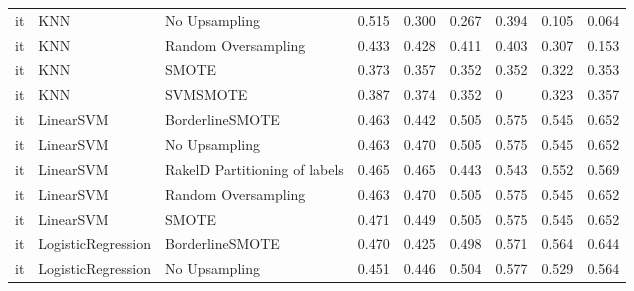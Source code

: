 \begin{tabular}{lllllllll}
      it &                             KNN &                 No Upsampling & 0.515 &                     0.300 &                 0.267 &                  0.394 &                                   0.105 &     0.064 \\
      it &                             KNN &           Random Oversampling & 0.433 &                     0.428 &                 0.411 &                  0.403 &                                   0.307 &     0.153 \\
      it &                             KNN &                         SMOTE & 0.373 &                     0.357 &                 0.352 &                  0.352 &                                   0.322 &     0.353 \\
      it &                             KNN &                      SVMSMOTE & 0.387 &                     0.374 &                 0.352 &                      0 &                                   0.323 &     0.357 \\
      it &                       LinearSVM &               BorderlineSMOTE & 0.463 &                     0.442 &                 0.505 &                  0.575 &                                   0.545 &     0.652 \\
      it &                       LinearSVM &                 No Upsampling & 0.463 &                     0.470 &                 0.505 &                  0.575 &                                   0.545 &     0.652 \\
      it &                       LinearSVM & RakelD Partitioning of labels & 0.465 &                     0.465 &                 0.443 &                  0.543 &                                   0.552 &     0.569 \\
      it &                       LinearSVM &           Random Oversampling & 0.463 &                     0.470 &                 0.505 &                  0.575 &                                   0.545 &     0.652 \\
      it &                       LinearSVM &                         SMOTE & 0.471 &                     0.449 &                 0.505 &                  0.575 &                                   0.545 &     0.652 \\
      it &              LogisticRegression &               BorderlineSMOTE & 0.470 &                     0.425 &                 0.498 &                  0.571 &                                   0.564 &     0.644 \\
      it &              LogisticRegression &                 No Upsampling & 0.451 &                     0.446 &                 0.504 &                  0.577 &                                   0.529 &     0.564 \\

\end{tabular}

